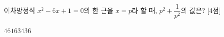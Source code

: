이차방정식 $x^2-6x+1=0$의 한 근을 $x=p$라 할 때, $p^2+\dfrac{1}{p^2}$의 값은? \mbox{[4점]}
\begin{choices32}{$4$}{$6$}{$16$}{$34$}{$36$}\end{choices32}
